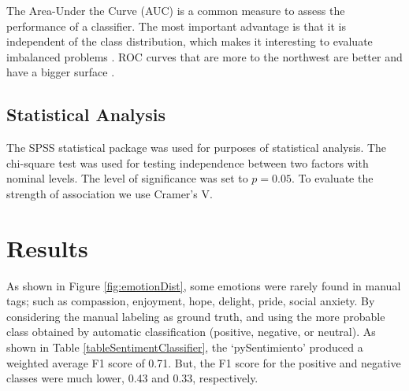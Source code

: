 \documentclass[3p,times,preprint]{elsarticle}
\begin{document}
The Area-Under the Curve (AUC) is a common measure to assess the performance of a classifier. The most important advantage is that it is independent of the class distribution, which makes it interesting to evaluate imbalanced problems \citep{Verbiest2015}. ROC curves that are more to the northwest are better and have a bigger surface \citep{Verbiest2015}.

\subsection{Statistical Analysis}
The SPSS statistical package was used for purposes of statistical analysis.  The chi-square test was used for testing independence between two factors with nominal levels. The level of significance was  set to $p = 0.05$. To evaluate the strength of association we use Cramer's V.








\section{Results}
\label{sec:results}




As shown in Figure \ref{fig:emotionDist},  some emotions were rarely found in manual tags; such as compassion, enjoyment, hope, delight, pride, social anxiety.  By considering the manual labeling as ground truth, and using the more probable class obtained by automatic classification (positive, negative, or neutral). As shown in Table \ref{tableSentimentClassifier}, \textcolor{coolblack}{the `pySentimiento' produced
 a weighted average F1 score of 0.71. But, the F1 score for the positive and negative classes were much lower, 0.43 and 0.33, respectively.}


\end{document}
